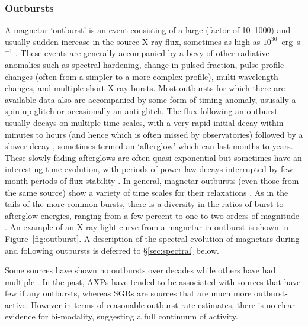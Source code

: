 

\subsubsection{Outbursts}
\label{sec:outbursts}

A magnetar `outburst' is an event consisting of a large (factor of 10--1000) and usually sudden increase in
the source X-ray flux, sometimes as high as $10^{36}$~erg~s$^{-1}$ \citep[see][for a compilation]{re11}.  These events are generally 
accompanied by a bevy of other radiative anomalies such as spectral hardening, change in pulsed fraction, pulse profile changes 
(often from a simpler to a more complex profile), multi-wavelength changes, and multiple short X-ray bursts.
Most outbursts for which there are available data also are accompanied by some form of timing
anomaly, ususally a spin-up glitch or occasionally an anti-glitch.  The flux following an outburst
usually decays on multiple time scales, with a very rapid initial decay within minutes to hours
(and hence which is often missed by observatories) followed by a slower decay \citep[e.g.][]{wkt+04},
sometimes termed an `afterglow' which can last months to years.  These slowly fading afterglows are often quasi-exponential
\citep[e.g.][]{rit+09} but sometimes have an interesting
time evolution, with periods of power-law decays interrupted by few-month periods of flux stability \citep[e.g.][]{akt+12}.
In general, magnetar outbursts (even those from the same source) show a variety of time scales for their 
relaxations \citep[e.g.][]{etr+13}.
As in the tails of the more common bursts, there is a diversity in the ratios of burst to afterglow energies, ranging from a
few percent to one to two orders of magnitude \citep{wkt+04}.  
An example of an X-ray light curve from a magnetar in outburst
is shown in Figure~\ref{fig:outburst}.
A description of the spectral evolution of magnetars during and following outbursts is
deferred to \S\ref{sec:spectral} below.

Some sources have shown no outbursts over decades \citep[e.g. 1RXS J1708$-$4009; ][]{dk14}
while others
have had multiple \citep[e.g. SGRs 1806$-$20, 1900+14, 1E 1547.0$-$5408;][]{wkf+07,ggo+11,nkd+11}. 
In the past, AXPs have tended to be associated with sources
that have few if any outbursts, whereas SGRs are sources that are much more outburst-active.  However in terms of
reasonable outburst rate estimates, there is no clear evidence for bi-modality, suggesting a full continuum of
activity.  

